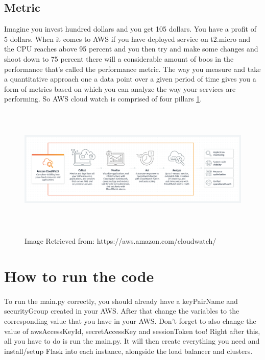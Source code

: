 \documentclass[12pt]{article}
\begin{document}
        \subsection{Metric}
        Imagine you invest hundred dollars and you get 105 dollars. You have a profit of 5 dollars.
        When it comes to AWS if you have deployed service on t2.micro and the CPU reaches above 95 percent 
		and you then try and make some changes and shoot down to 75 percent there will a considerable amount 
		of boos in the performance that's called the performance metric. The way you measure and take a 
		quantitative approach one a data point over a given period of time gives you a form of metrics based 
		on which you can analyze the way your services are performing. So AWS cloud watch is comprised of four 
		pillars \ref{fig:cw}.

        \begin{figure}[htpb]
        \centering
        \includegraphics[width=\textwidth,height=6cm,keepaspectratio=true]{images/cloudwatch.png}
            \caption\small{Image Retrieved from: https://aws.amazon.com/cloudwatch/}
            \label{fig:cw}
        \end{figure}
            



	\pagebreak


\section{How to run the code} \label{sec:runcode}
	\paragraph{} To run the main.py correctly, you should already have a keyPairName and securityGroup created in your AWS. After that 
	change the variables to the corresponding value that you have in your AWS. Don't forget to also change the value
	of awsAccessKeyId, secretAccessKey and sessionToken too! Right after this, all you have to do is run the main.py. It will then
	create everything you need and install/setup Flask into each instance, alongside the load balancer and clusters. 
	\bigskip
\end{document}
